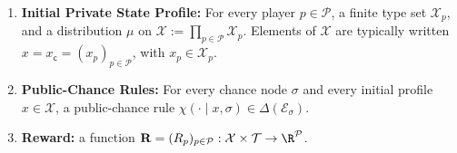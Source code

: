 \documentclass[12pt, a4paper]{article}
\begin{document}
\begin{definition}
\begin{enumerate}[label =(\roman*)]
    \item \textbf{Initial Private State Profile:} For every player $p\in \mathcal P$, a finite type set $\mathcal X_p$, and a distribution $\mu$ on $\mathcal X:=\prod_{p\in\mathcal P}\mathcal X_p$.
    Elements of $\mathcal X$ are typically written $x= x_{\mathsf c} = (x_p)_{p \in \mathcal P}$, with $x_p\in\mathcal X_p$.

    \item \textbf{Public-Chance Rules:} For every chance node $\sigma$ and every initial profile $x \in \mathcal{X}$, a public-chance rule $\chi(\cdot \mid x, \sigma)\in \Delta(\mathcal E_\sigma)$.

    \item \textbf{Reward:} a function $\mathbf{R} = (R_p)_{p \in \mathcal{P}}: \mathcal{X} \times \mathcal{T}\to\R^{\mathcal{P}}$.
\end{enumerate}
\end{definition}
\end{document}
